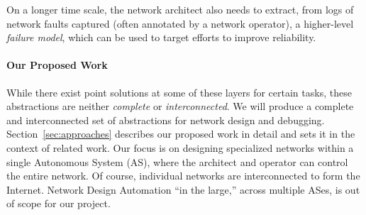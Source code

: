  On a longer time scale, the
network architect also needs to extract, from logs of network faults
captured (often annotated by a network operator), a higher-level
{\em failure model}, which can be used to target efforts to improve
reliability. 

\paragraph*{Our Proposed Work} While there exist point solutions at some of
these layers for certain tasks, these abstractions are neither {\em
  complete} or {\em interconnected}. We will produce a complete and
interconnected set of abstractions for network design and debugging.
Section~\ref{sec:approaches} describes our proposed work
in detail and sets it in the context of related work.
%
%
Our focus is on designing specialized networks within a single
Autonomous System (AS), where the architect and operator can control the 
entire network.  Of course, individual networks are interconnected to form the Internet.  Network Design Automation ``in the large,'' across multiple ASes, is out of scope for our project.





 
